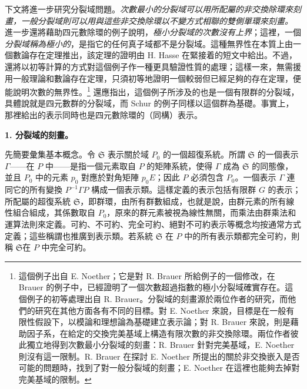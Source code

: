\documentclass[11pt]{article}
\providecommand{\srcspaced}[1]{\emph{#1}}
\providecommand{\mS}{\mathfrak{S}}
\begin{document}
下文將進一步研究分裂域問題。\srcspaced{次數最小的分裂域可以用所配屬的非交換除環來刻畫，一般分裂域則可以用與這些非交換除環以不變方式相聯的雙側單環來刻畫。} 進一步還將藉助四元數除環的例子說明，\srcspaced{極小分裂域的次數沒有上界}；這裡，一個\srcspaced{分裂域稱為極小的}，是指它的任何真子域都不是分裂域。這種無界性在本質上由一個數論存在定理推出，該定理的證明由 H. Hasse 在緊接着的短文中給出。不過，還將以初等計算的方式對這個例子作一種更具驗證性質的處理；這樣一來，無需援用一般理論和數論存在定理，只須初等地證明一個較弱但已經足夠的存在定理，便能說明次數的無界性。\footnote{這個例子出自 E. Noether；它是對 R. Brauer 所給例子的一個修改，在 Brauer 的例子中，已經證明了一個次數超過指數的極小分裂域確實存在。這個例子的初等處理出自 R. Brauer。分裂域的刻畫源於兩位作者的研究，而他們的研究在其他方面各有不同的目標。對 E. Noether 來說，目標是在一般有限性假設下，以模論和理想論為基礎建立表示論；對 R. Brauer 來說，則是藉助因子系，在給定的交換完美基域上構造有限次數的非交換除環。兩位作者彼此獨立地得到次數最小分裂域的刻畫：R. Brauer 針對完美基域，E. Noether 則沒有這一限制。R. Brauer 在探討 E. Noether 所提出的關於非交換嵌入是否可能的問題時，找到了對一般分裂域的刻畫；E. Noether 在這裡也能夠去掉對完美基域的限制。} 還應指出，這個例子所涉及的也是一個有限群的分裂域，具體說就是四元數群的分裂域，而 Schur 的例子同樣以這個群為基礎。事實上，那裡給出的表示同時也是四元數除環的（同構）表示。

\begin{center}
\textbf{1. 分裂域的刻畫。}
\end{center}

先簡要彙集基本概念。令 $\mS$ 表示關於域 $P_0$ 的一個超復系統。所謂 $\mS$ 的一個表示 $\Gamma$——在 $P$ 中——是指一個元素取自 $P$ 的矩陣系統，使得 $\Gamma$ 成為 $\mS$ 的同態像，並且 $P_0$ 中的元素 $p_0$ 對應於對角矩陣 $p_0E$；因此 $P$ 必須包含 $P_0$。一個表示 $\Gamma$ 連同它的所有變換 $P^{-1}\Gamma P$ 構成一個表示類。這樣定義的表示包括有限群 $G$ 的表示；所配屬的超復系統 $\mS$，即\guillemotright{}群環\guillemotleft{}，由所有\guillemotright{}群數\guillemotleft{}組成，也就是說，由群元素的所有線性組合組成，其係數取自 $P_0$，原來的群元素被視為線性無關，而乘法由群乘法和運算法則來定義。\guillemotright{}可約\guillemotleft{}、\guillemotright{}不可約\guillemotleft{}、\guillemotright{}完全可約\guillemotleft{}、\guillemotright{}絕對不可約\guillemotleft{}表示等概念均按通常方式定義；這些稱謂也推廣到表示類。若系統 $\mS$ 在 $P$ 中的所有表示類都完全可約，則稱 $\mS$\guillemotright{}在 $P$ 中完全可約\guillemotleft{}。
\end{document}
